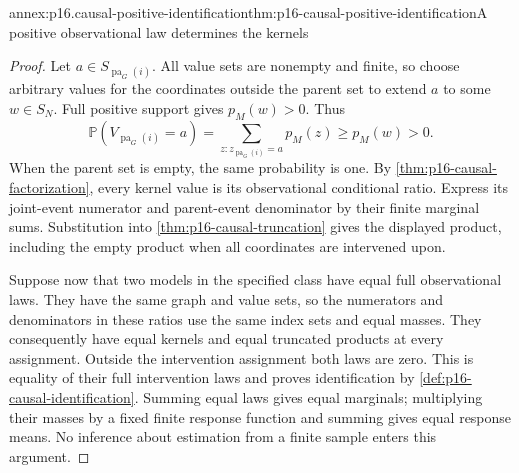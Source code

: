 \begin{annexitem}{annex:p16.causal-positive-identification}{thm:p16-causal-positive-identification}{A positive observational law determines the kernels}
\begin{proof}
Let \(a\in S_{\operatorname{pa}_G(i)}\). All value sets are
nonempty and finite, so choose arbitrary values for the coordinates
outside the parent set to extend \(a\) to some \(w\in S_N\).
Full positive support gives \(p_M(w)>0\). Thus
\[
 \mathbb P(V_{\operatorname{pa}_G(i)}=a)
   =\sum_{z:z_{\operatorname{pa}_G(i)}=a}p_M(z)
   \geq p_M(w)>0.
\]
When the parent set is empty, the same probability is one. By
\cref{thm:p16-causal-factorization}, every kernel value is its
observational conditional ratio. Express its joint-event numerator and
parent-event denominator by their finite marginal sums. Substitution
into \cref{thm:p16-causal-truncation} gives the displayed product,
including the empty product when all coordinates are intervened upon.

Suppose now that two models in the specified class have equal full
observational laws. They have the same graph and value sets, so the
numerators and denominators in these ratios use the same index sets and
equal masses. They consequently have equal kernels and equal truncated
products at every assignment. Outside the intervention assignment both
laws are zero. This is equality of their full intervention laws and proves
identification by \cref{def:p16-causal-identification}.
Summing equal laws gives equal marginals; multiplying their masses by a
fixed finite response function and summing gives equal response means.
No inference about estimation from a finite sample enters this argument.
\end{proof}
\end{annexitem}

